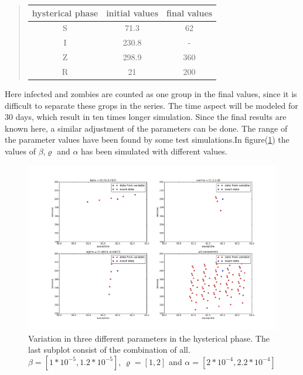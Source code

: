 \documentclass[%
twoside,                 %
final,                   %
10pt]{article}
\begin{document}
\begin{quote}
\begin{tabular}{ccc}
\hline
\multicolumn{1}{c}{ hysterical phase } & \multicolumn{1}{c}{ initial values } & \multicolumn{1}{c}{ final values } \\
\hline
S                & 71.3             & 62               \\
I                & 230.8            & -                \\
Z                & 298.9            & 360              \\
R                & 21               & 200              \\
\hline
\end{tabular}
\end{quote}

\noindent
Here infected and zombies are counted as one group in the final values, since it is difficult to separate these grops in the series. The time aspect will be modeled for 30 days, which result in ten times longer simulation. Since the final results are known here, a similar adjustment of the parameters can be done. The range of the parameter values have been found by some test simulations.In figure(\ref{fig:hysterical_variations}) the values of $\beta$,$\varrho$ and $\alpha$ has been simulated with different values. 


\begin{figure}[ht]
  \centerline{\includegraphics[width=0.9\linewidth]{plots/check_parameters_hysterical_2.png}}
  \caption{
  \label{fig:hysterical_variations} Variation in three different parameters in the hysterical phase. The last subplot consist of the combination of all. $\beta=[1*10^{-5},1.2*10^{-5}]$, $\varrho=[1,2]$ and $\alpha=[2*10^{-4},2.2*10^{-4}]$
  }
\end{figure}
\end{document}
